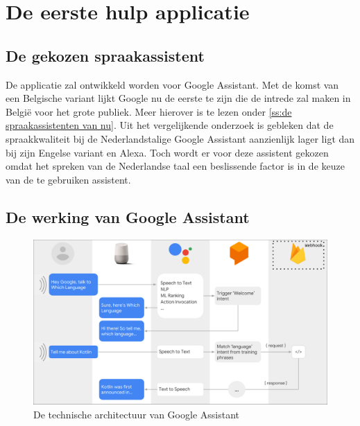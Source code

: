 
\chapter{De eerste hulp applicatie}
\label{ch:eerstehulpapp}

\section{De gekozen spraakassistent}
De applicatie zal ontwikkeld worden voor Google Assistant. Met de komst van een Belgische variant lijkt Google nu de eerste te zijn die de intrede zal maken in België voor het grote publiek. Meer hierover is te lezen onder \ref{ss:de spraakassistenten van nu}.
Uit het vergelijkende onderzoek is gebleken dat de spraakkwaliteit bij de Nederlandstalige Google Assistant aanzienlijk lager ligt dan bij zijn Engelse variant en Alexa. Toch wordt er voor deze assistent gekozen omdat het spreken van de Nederlandse taal een beslissende factor is in de keuze van de te gebruiken assistent.

\section{De werking van Google Assistant}
\begin{figure}[h]
    \centering
    \includegraphics[width=0.7\linewidth]{img/gaflow}
    \caption{De technische architectuur van Google Assistant \autocite{Brandt2018}}
    \label{fig:gaflow}
\end{figure}

